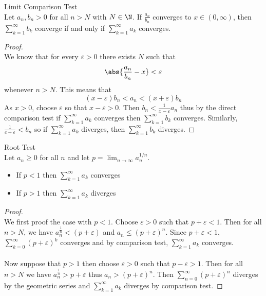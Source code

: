 \documentclass[a4paper]{article}
\begin{document}
\begin{thm}{Limit Comparison Test}{}\\ Let $a_n, b_n>0$ for all $n>N$ with $N\in\N$. If $\frac{a_n}{b_n}$ converges to $x\in(0,\infty)$, then $\sum_{k=1}^\infty b_k$ converge if and only if $\sum_{k=1}^\infty a_k$ converges. 
\begin{proof}\\ We know that for every $\varepsilon>0$ there exists $N$ such that $$\abs{\frac{a_n}{b_n}-x}<\varepsilon$$ whenever $n>N$. This means that $$(x-\varepsilon)b_n<a_n<(x+\varepsilon)b_n$$ As $x>0$, choose $\varepsilon$ so that $x-\varepsilon>0$. Then $b_n<\frac{1}{x-\varepsilon}a_n$ thus by the direct comparison test if $\sum_{k=1}^\infty a_k$ converges then $\sum_{k=1}^\infty b_k$ converges. Similarly, $\frac{1}{c+\varepsilon}<b_n$ so if $\sum_{k=1}^\infty a_k$ diverges, then $\sum_{k=1}^\infty b_k$ diverges. 
\end{proof}
\end{thm}

\begin{thm}{Root Test}{}\\ Let $a_n\geq0$ for all $n$ and let $p=\lim_{n\to\infty}a_n^{1/n}$. 
\begin{itemize}
\item If $p<1$ then $\sum_{k=1}^\infty a_k$ converges
\item If $p>1$ then $\sum_{k=1}^\infty a_k$ diverges
\end{itemize} 
\begin{proof}\\ We first proof the case with $p<1$. Choose $\varepsilon>0$ such that $p+\varepsilon<1$. Then for all $n>N$, we have $a_n^\frac{1}{n}<(p+\varepsilon)$ and $a_n\leq(p+\varepsilon)^n$. Since $p+\varepsilon<1$, $\sum_{k=0}^{\infty}(p+\varepsilon)^k$ converges and by comparison test, $\sum_{k=1}^\infty a_k$ converges. \\~\\
Now suppose that $p>1$ then choose $\varepsilon>0$ such that $p-\varepsilon>1$. Then for all $n>N$ we have $a_n^\frac{1}{n}>p+\varepsilon$ thus $a_n>(p+\varepsilon)^n$. Then $\sum_{n=0}^{\infty}(p+\varepsilon)^n$ diverges by the geometric series and $\sum_{k=1}^\infty a_k$ diverges by comparison test. 
\end{proof}
\end{thm}
\end{document}
